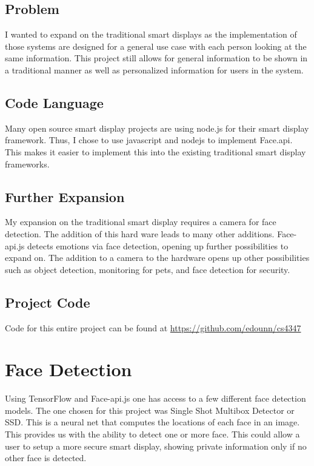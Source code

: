 \documentclass[10pt,twocolumn,letterpaper]{article}
\begin{document}
\subsection{Problem}

I wanted to expand on the traditional smart displays as the implementation of those systems are designed for a general use case with each person looking at the same information.  This project still allows for general information to be shown in a traditional manner as well as personalized information for users in the system.

\subsection{Code Language}

Many open source smart display projects are using node.js for their smart display framework.  Thus, I chose to use javascript and nodejs to implement Face.api.  This makes it easier to implement this into the existing traditional smart display frameworks.\cite{Stephen}

\subsection{Further Expansion}
My expansion on the traditional smart display requires a camera for face detection. The addition of this hard ware leads to many other additions.  Face-api.js detects emotions via face detection, opening up further possibilities to expand on.  The addition to a camera to the hardware opens up other possibilities such as object detection, monitoring for pets, and face detection for security.


\subsection{Project Code}

Code for this entire project can be found at \url{https://github.com/edounn/cs4347}

\section{Face Detection}

Using TensorFlow and Face-api.js one has access to a few different face detection models.  The one chosen for this project was Single Shot Multibox Detector or SSD.  This is a neural net that computes the locations of each face in an image.  This provides us with the ability to detect one or more face.  This could allow a user to setup a more secure smart display, showing private information only if no other face is detected. 
\end{document}
